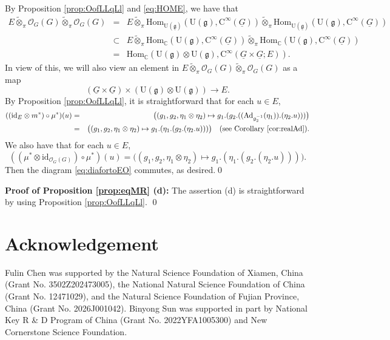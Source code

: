 \documentclass[12pt, a4paper]{amsart}
\newcommand{\BC}{{\mathbb {C}}}
\newcommand{\CO}{{\mathcal {O}}}
\newcommand{\RC}{{\mathrm {C}}}
\newcommand{\RU}{{\mathrm {U}}}
\newcommand{\Ad}{{\mathrm{Ad}}}
\newcommand{\Hom}{{\mathrm{Hom}}}
\newcommand{\wo}{{\widetilde\otimes}}
\newcommand{\wt}{\widetilde}
\newcommand{\g}{\mathfrak g}
\theoremstyle{Theorem}
\theoremstyle{Theorem}
\theoremstyle{Theorem}
\theoremstyle{Theorem}
\theoremstyle{Plain}
\theoremstyle{remark}
\theoremstyle{remark}
\theoremstyle{Definition}
\numberwithin{equation}{section}
\begin{document}
By Proposition \ref{prop:OofLLqLl} and \eqref{eq:HOME}, we have that \begin{eqnarray*}E\wt\otimes_{\pi} \CO_G(G)\wt\otimes_{\pi} \CO_G(G) &=&E\wo_{\pi}\Hom_{\RU(\underline{\g})}(\RU(\g),\RC^{\infty}(\underline{G}))\wo_{\pi}\Hom_{\RU(\underline{\g})}(\RU(\g),\RC^{\infty}(\underline{G}))\\&\subset& E\wo_{\pi}\Hom_{\BC}(\RU(\g),\RC^{\infty}(\underline{G}))\wo_{\pi}\Hom_{\BC}(\RU(\g),\RC^{\infty}(\underline{G}))\\ &=&\Hom_{\BC}(\RU(\g)\otimes \RU(\g),\RC^{\infty}(\underline{G}\times\underline{G};E)).\end{eqnarray*}
In view of this, we will also view an element in 
$E\wt\otimes_{\pi} \CO_G(G)\wt\otimes_{\pi} \CO_G(G) $ as  a map \[(\underline{G}\times\underline{G})\times(\RU(\g)\otimes \RU(\g))\rightarrow E.\]  %
By Proposition \ref{prop:OofLLqLl}, it is straightforward that  for each $u\in E$, 
\begin{eqnarray*}
    ((\mathrm{id}_E\otimes m^*)\circ\mu^*)(u)&=&\big((g_1,g_2,\eta_1\otimes\eta_2)\mapsto g_1.(g_2.((\Ad_{g_2^{-1}}(\eta_1)).(\eta_2.u)))\big)\\
    &=&\big((g_1,g_2,\eta_1\otimes\eta_2)\mapsto g_1.(\eta_1.(g_2.(\eta_2.u)))\big)\quad \text{(see Corollary \ref{cor:realAd})}.
\end{eqnarray*}
We also have that  for each $u\in E$, 
\[((\mu^* \otimes \mathrm{id}_{\CO_G(G)} )\circ \mu^*)(u)=\big((g_1,g_2,\eta_1\otimes\eta_2)\mapsto g_1.(\eta_1.(g_2.(\eta_2.u)))\big).\] Then the diagram \eqref{eq:diafortoEO} commutes, as desired.\qed

\vspace{3mm}
\noindent\textbf{Proof of Proposition \ref{prop:eqMR} (d):} The assertion (d) is straightforward by using Proposition \ref{prop:OofLLqLl}.
\qed


 




\section*{Acknowledgement}
Fulin Chen was supported by the Natural Science Foundation of Xiamen, China (Grant No. 3502Z202473005), the National Natural Science Foundation of China (Grant No. 12471029), and the Natural Science Foundation of Fujian Province, China (Grant No. 2026J001042). Binyong Sun was supported in part by National Key R \& D Program of China (Grant No. 2022YFA1005300) and New Cornerstone
Science Foundation. %
\end{document}

